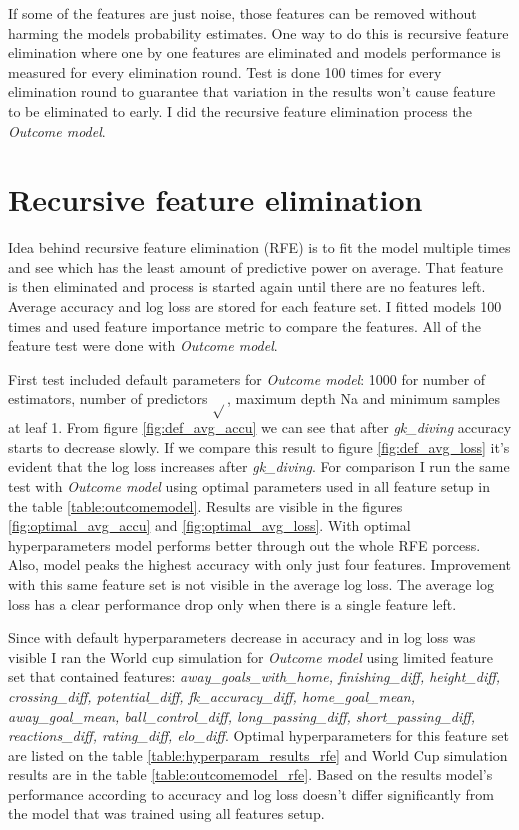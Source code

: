 If some of the features are just noise, those features can be removed without harming the models probability estimates. One way to do this is recursive feature elimination where one by one features are eliminated and models performance is measured for every  elimination round. Test is done 100 times for every elimination round to guarantee that variation in the results won't cause feature to be eliminated to early. I did the recursive feature elimination process the \textit{Outcome model}.

\section{Recursive feature elimination}
Idea behind recursive feature elimination (RFE) is to fit the model multiple times and see which has the least amount of predictive power on average. That feature is then eliminated and process is started again until there are no features left. Average accuracy and log loss are stored for each feature set. I fitted models 100 times and used feature importance metric to compare the features. All of the feature test were done with \textit{Outcome model}.

First test included default parameters for \textit{Outcome model}: 1000 for number of estimators, number of predictors $\sqrt{}$, maximum depth Na and minimum samples at leaf 1. From figure \ref{fig:def_avg_accu} we can see that after \textit{gk\_diving} accuracy starts to decrease slowly. If we compare this result to figure \ref{fig:def_avg_loss}
it's evident that the log loss increases after \textit{gk\_diving}. For comparison I run the same test with \textit{Outcome model} using optimal parameters used in all feature setup in the table \ref{table:outcomemodel}. Results are visible in the figures \ref{fig:optimal_avg_accu} and \ref{fig:optimal_avg_loss}. With optimal hyperparameters model performs better through out the whole RFE porcess. Also, model peaks the highest accuracy with only just four features. Improvement with this same feature set is not visible in the average log loss. The average log loss has a clear performance drop only when there is a single feature left.

Since with default hyperparameters decrease in accuracy and in log loss was visible I ran the World cup simulation for \textit{Outcome model} using limited feature set that contained features: \textit{away\_goals\_with\_home, finishing\_diff, height\_diff, crossing\_diff, potential\_diff, fk\_accuracy\_diff, home\_goal\_mean, away\_goal\_mean, ball\_control\_diff, long\_passing\_diff,  short\_passing\_diff, reactions\_diff, rating\_diff, elo\_diff}. Optimal hyperparameters for this feature set are listed on the table \ref{table:hyperparam_results_rfe} and World Cup simulation results are in the table \ref{table:outcomemodel_rfe}. Based on the results model's performance according to accuracy and log loss doesn't differ significantly from the model that was trained using all features setup.

